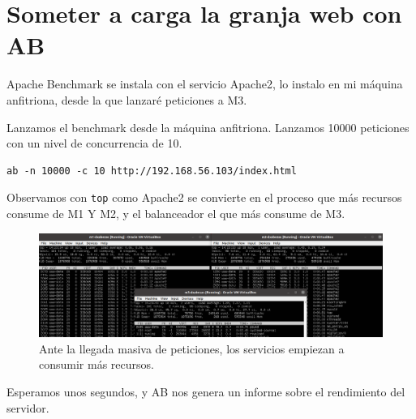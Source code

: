 \documentclass{article}
\begin{document}
\section{Someter a carga la granja web con AB}

Apache Benchmark se instala con el servicio Apache2, lo instalo en mi máquina anfitriona, desde la que lanzaré
peticiones a M3.

Lanzamos el benchmark desde la máquina anfitriona. Lanzamos 10000 peticiones con un nivel de concurrencia de 10.

\begin{Verbatim}[tabsize=4]
ab -n 10000 -c 10 http://192.168.56.103/index.html
\end{Verbatim}

Observamos con \texttt{top} como Apache2 se convierte en el proceso que más recursos consume de M1 Y M2, y 
el balanceador el que más consume de M3.

\begin{figure}[H]
	\centering
	\includegraphics[width=170mm]{imgs/top}
	\caption{Ante la llegada masiva de peticiones, los servicios empiezan a consumir más recursos.}
	\label{fig:top}
\end{figure}

Esperamos unos segundos, y AB nos genera un informe sobre el rendimiento del servidor.
\end{document}
